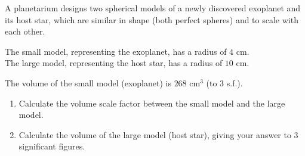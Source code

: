 \begin{question}
\noindent A planetarium designs two spherical models of a newly discovered exoplanet and its host star, which are similar in shape (both perfect spheres) and to scale with each other.

\noindent The small model, representing the exoplanet, has a radius of $4$ cm.\\
The large model, representing the host star, has a radius of $10$ cm.

\noindent The volume of the small model (exoplanet) is $268$ cm$^3$ (to 3 s.f.).

\begin{enumerate}
    \item[(a)] Calculate the volume scale factor between the small model and the large model.
    \vspace{3.5cm}

    \item[(b)] Calculate the volume of the large model (host star), giving your answer to 3 significant figures.
    \vspace{4cm}
\end{enumerate}
\end{question}
